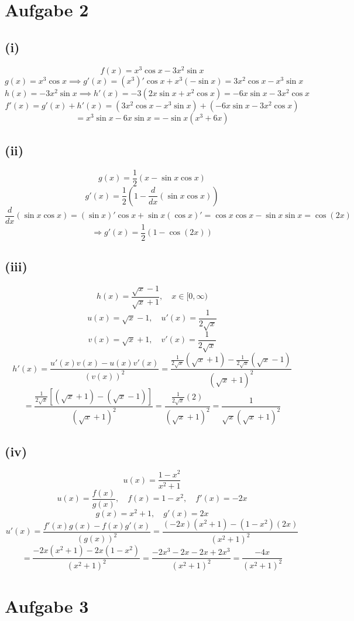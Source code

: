 \documentclass{article}
\begin{document}
\section*{Aufgabe 2}
\subsection*{(i)}
\[f(x) = x^3 \cos x - 3x^2 \sin x\]
\[g(x) = x^3 \cos x \implies g'(x) = (x^3)' \cos x + x^3(-\sin x) = 3x^2 \cos x - x^3 \sin x\]
\[h(x) = -3x^2 \sin x \implies h'(x) = -3(2x \sin x + x^2 \cos x) = -6x \sin x - 3x^2 \cos x\]
\[f'(x) = g'(x) + h'(x) = (3x^2 \cos x - x^3 \sin x) + (-6x \sin x - 3x^2 \cos x)\]
\[= x^3 \sin x - 6x \sin x = -\sin x (x^3 + 6x)\]


\subsection*{(ii)}
\[g(x) = \frac{1}{2}(x - \sin x \cos x)\]
\[g'(x) = \frac{1}{2} \left(1 - \frac{d}{dx}(\sin x \cos x) \right)\]
\[\frac{d}{dx}(\sin x \cos x) = (\sin x)' \cos x + \sin x (\cos x)' = \cos x \cos x - \sin x \sin x = \cos(2x)\]
\[\Rightarrow g'(x) = \frac{1}{2}(1 - \cos(2x))\]

\subsection*{(iii)}
\[h(x) = \frac{\sqrt{x} - 1}{\sqrt{x} + 1}, \quad x \in [0,\infty)\]
\[u(x) = \sqrt{x} - 1, \quad u'(x) = \frac{1}{2\sqrt{x}} \]
\[v(x) = \sqrt{x} + 1, \quad v'(x) = \frac{1}{2\sqrt{x}} \]
\[
h'(x) = \frac{u'(x) v(x) - u(x) v'(x)}{(v(x))^2}
= \frac{\frac{1}{2\sqrt{x}}(\sqrt{x} + 1) - \frac{1}{2\sqrt{x}}(\sqrt{x} - 1)}{(\sqrt{x} + 1)^2}
\]
\[
= \frac{\frac{1}{2\sqrt{x}} \left[(\sqrt{x} + 1) - (\sqrt{x} - 1)\right]}{(\sqrt{x} + 1)^2}
= \frac{\frac{1}{2\sqrt{x}}(2)}{(\sqrt{x} + 1)^2}
= \frac{1}{\sqrt{x}(\sqrt{x} + 1)^2}
\]

\subsection*{(iv)}
\[u(x) = \frac{1 - x^2}{x^2 + 1}\]
\[u(x) = \frac{f(x)}{g(x)}, \quad f(x) = 1 - x^2, \quad f'(x) = -2x\]
\[g(x) = x^2 + 1, \quad g'(x) = 2x\]
\[
u'(x) = \frac{f'(x)g(x) - f(x)g'(x)}{(g(x))^2}
= \frac{(-2x)(x^2 + 1) - (1 - x^2)(2x)}{(x^2 + 1)^2}
\]
\[
= \frac{-2x(x^2 + 1) - 2x(1 - x^2)}{(x^2 + 1)^2}
= \frac{-2x^3 - 2x - 2x + 2x^3}{(x^2 + 1)^2}
= \frac{-4x}{(x^2 + 1)^2}
\]

\section*{Aufgabe 3}
\end{document}
